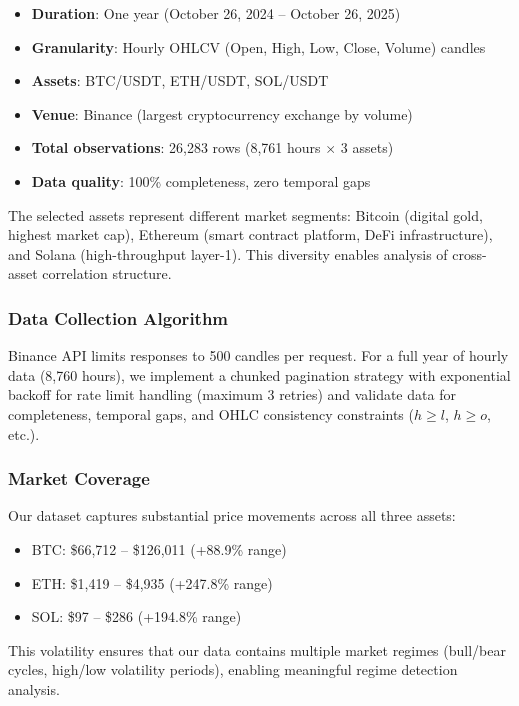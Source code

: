 \documentclass[11pt,twocolumn]{article}
\begin{document}
\begin{itemize}[leftmargin=*]
    \item \textbf{Duration}: One year (October 26, 2024 -- October 26, 2025)
    \item \textbf{Granularity}: Hourly OHLCV (Open, High, Low, Close, Volume) candles
    \item \textbf{Assets}: BTC/USDT, ETH/USDT, SOL/USDT
    \item \textbf{Venue}: Binance (largest cryptocurrency exchange by volume)
    \item \textbf{Total observations}: 26,283 rows (8,761 hours $\times$ 3 assets)
    \item \textbf{Data quality}: 100\% completeness, zero temporal gaps
\end{itemize}

The selected assets represent different market segments: Bitcoin (digital gold, highest market cap), Ethereum (smart contract platform, DeFi infrastructure), and Solana (high-throughput layer-1). This diversity enables analysis of cross-asset correlation structure.

\subsubsection{Data Collection Algorithm}

Binance API limits responses to 500 candles per request. For a full year of hourly data (8,760 hours), we implement a chunked pagination strategy with exponential backoff for rate limit handling (maximum 3 retries) and validate data for completeness, temporal gaps, and OHLC consistency constraints ($h \geq l$, $h \geq o$, etc.).

\subsubsection{Market Coverage}

Our dataset captures substantial price movements across all three assets:

\begin{itemize}[leftmargin=*]
    \item BTC: \$66,712 -- \$126,011 (+88.9\% range)
    \item ETH: \$1,419 -- \$4,935 (+247.8\% range)
    \item SOL: \$97 -- \$286 (+194.8\% range)
\end{itemize}

This volatility ensures that our data contains multiple market regimes (bull/bear cycles, high/low volatility periods), enabling meaningful regime detection analysis.
\end{document}
